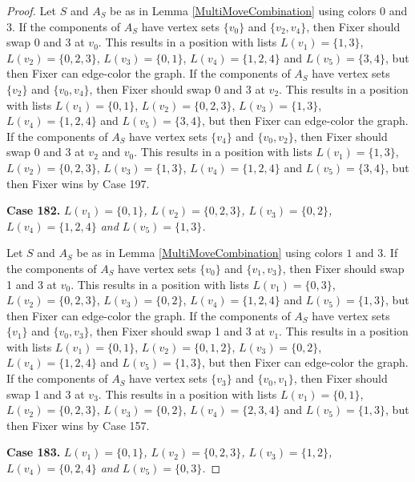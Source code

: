 \documentclass[12pt]{amsart}
\theoremstyle{plain}
\theoremstyle{definition}
\theoremstyle{remark}
\begin{document}
\begin{proof}
Let $S$ and $A_S$ be as in Lemma \ref{MultiMoveCombination} using colors $0$ and $3$. If the components of $A_S$ have vertex sets $\{v_0\}$ and $\{v_2, v_4\}$, then Fixer should swap 0 and 3 at $v_0$. This results in a position with lists $L(v_1) = \{1, 3\}$, $L(v_2) = \{0, 2, 3\}$, $L(v_3) = \{0, 1\}$, $L(v_4) = \{1, 2, 4\}$ and $L(v_5) = \{3, 4\}$, but then Fixer can edge-color the graph.
If the components of $A_S$ have vertex sets $\{v_2\}$ and $\{v_0, v_4\}$, then Fixer should swap 0 and 3 at $v_2$. This results in a position with lists $L(v_1) = \{0, 1\}$, $L(v_2) = \{0, 2, 3\}$, $L(v_3) = \{1, 3\}$, $L(v_4) = \{1, 2, 4\}$ and $L(v_5) = \{3, 4\}$, but then Fixer can edge-color the graph.
If the components of $A_S$ have vertex sets $\{v_4\}$ and $\{v_0, v_2\}$, then Fixer should swap 0 and 3 at $v_2$ and $v_0$. This results in a position with lists $L(v_1) = \{1, 3\}$, $L(v_2) = \{0, 2, 3\}$, $L(v_3) = \{1, 3\}$, $L(v_4) = \{1, 2, 4\}$ and $L(v_5) = \{3, 4\}$, but then Fixer wins by Case 197.

\noindent\textbf{Case 182.  }\textit{$L(v_1) = \{0, 1\}$, $L(v_2) = \{0, 2, 3\}$, $L(v_3) = \{0, 2\}$, $L(v_4) = \{1, 2, 4\}$ and $L(v_5) = \{1, 3\}$.}

Let $S$ and $A_S$ be as in Lemma \ref{MultiMoveCombination} using colors $1$ and $3$. If the components of $A_S$ have vertex sets $\{v_0\}$ and $\{v_1, v_3\}$, then Fixer should swap 1 and 3 at $v_0$. This results in a position with lists $L(v_1) = \{0, 3\}$, $L(v_2) = \{0, 2, 3\}$, $L(v_3) = \{0, 2\}$, $L(v_4) = \{1, 2, 4\}$ and $L(v_5) = \{1, 3\}$, but then Fixer can edge-color the graph.
If the components of $A_S$ have vertex sets $\{v_1\}$ and $\{v_0, v_3\}$, then Fixer should swap 1 and 3 at $v_1$. This results in a position with lists $L(v_1) = \{0, 1\}$, $L(v_2) = \{0, 1, 2\}$, $L(v_3) = \{0, 2\}$, $L(v_4) = \{1, 2, 4\}$ and $L(v_5) = \{1, 3\}$, but then Fixer can edge-color the graph.
If the components of $A_S$ have vertex sets $\{v_3\}$ and $\{v_0, v_1\}$, then Fixer should swap 1 and 3 at $v_3$. This results in a position with lists $L(v_1) = \{0, 1\}$, $L(v_2) = \{0, 2, 3\}$, $L(v_3) = \{0, 2\}$, $L(v_4) = \{2, 3, 4\}$ and $L(v_5) = \{1, 3\}$, but then Fixer wins by Case 157.

\noindent\textbf{Case 183.  }\textit{$L(v_1) = \{0, 1\}$, $L(v_2) = \{0, 2, 3\}$, $L(v_3) = \{1, 2\}$, $L(v_4) = \{0, 2, 4\}$ and $L(v_5) = \{0, 3\}$.}


\end{proof}
\end{document}
